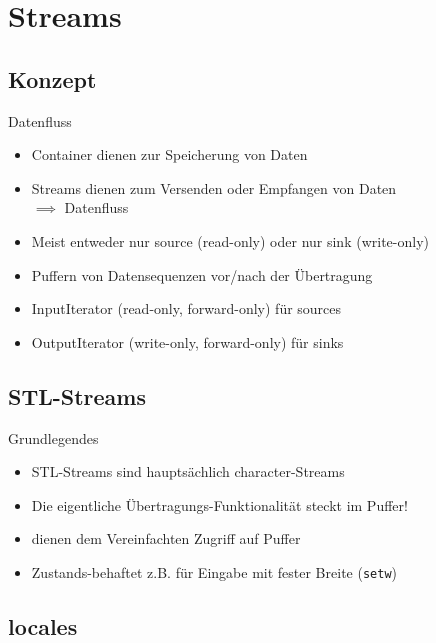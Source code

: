 \section{Streams}


\subsection{Konzept}

\begin{frame}{Datenfluss}
	\begin{itemize}
		\item Container dienen zur Speicherung von Daten
		\item Streams dienen zum Versenden oder Empfangen von Daten\\
		      $\implies$ Datenfluss
		\item Meist entweder nur source (read-only) oder nur sink (write-only)
		\item Puffern von Datensequenzen vor/nach der Übertragung
		\item InputIterator (read-only, forward-only) für sources
		\item OutputIterator (write-only, forward-only) für sinks
	\end{itemize}
\end{frame}


\subsection{STL-Streams}

\begin{frame}{Grundlegendes}
	\begin{itemize}
		\item STL-Streams sind hauptsächlich character-Streams
		\item Die eigentliche Übertragungs-Funktionalität steckt im Puffer!
		\item dienen dem Vereinfachten Zugriff auf Puffer
		\item Zustands-behaftet z.B. für Eingabe mit fester Breite (\texttt{setw})
	\end{itemize}
\end{frame}


\subsection{locales}

